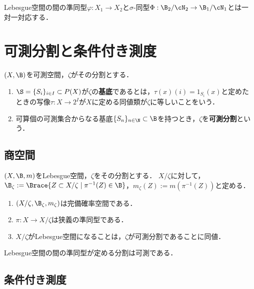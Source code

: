 \documentclass[uplatex,dvipdfmx]{jsreport}
\begin{document}
\begin{corollary}
    Lebesgue空間の間の準同型$\varphi:X_1\to X_2$と$\sigma$-同型$\Phi:\B_2/\cN_2\to\B_1/\cN_1$とは一対一対応する．
\end{corollary}

\section{可測分割と条件付き測度}

\begin{definition}
    $(X,\B)$を可測空間，$\zeta$がその分割とする．
    \begin{enumerate}
        \item $\S=\{S_i\}_{i\in I}\subset P(X)$が$\zeta$の\textbf{基底}であるとは，$\tau(x)(i)=1_{S_i}(x)$と定めたときの写像$\tau:X\to 2^I$が$X$に定める同値類が$\zeta$に等しいことをいう．
        \item 可算個の可測集合からなる基底$\{S_n\}_{n\in\N}\subset\B$を持つとき，$\zeta$を\textbf{可測分割}という．
    \end{enumerate}
\end{definition}

\subsection{商空間}

\begin{theorem}
    $(X,\B,m)$をLebesgue空間，$\zeta$をその分割とする．
    $X/\zeta$に対して，$\B_\zeta:=\Brace{Z\subset X/\zeta\mid\pi^{-1}(Z)\in\B}$，$m_\zeta(Z):=m(\pi^{-1}(Z))$と定める．
    \begin{enumerate}
        \item $(X/\zeta,\B_\zeta,m_\zeta)$は完備確率空間である．
        \item $\pi:X\to X/\zeta$は狭義の準同型である．
        \item $X/\zeta$がLebesgue空間になることは，$\zeta$が可測分割であることに同値．
    \end{enumerate}
\end{theorem}

\begin{corollary}
    Lebesgue空間の間の準同型が定める分割は可測である．
\end{corollary}

\subsection{条件付き測度}
\end{document}
